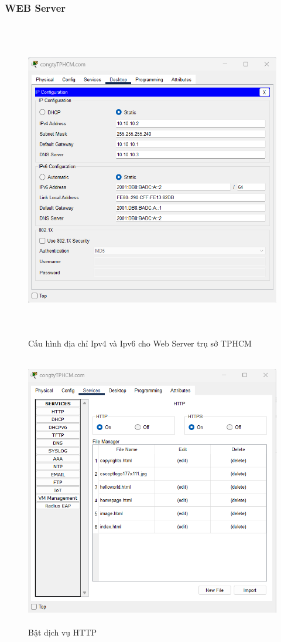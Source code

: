 \documentclass[12pt,a4paper]{report}
\begin{document}
\subsubsection{WEB Server }
\begin{figure}[H]
    \centering
    \includegraphics[width=16cm, height=14cm]{img/Web_Server1.png}
    \caption{Cấu hình địa chỉ Ipv4 và Ipv6 cho Web Server trụ sở TPHCM}
    \label{hinh421}
    
\end{figure}


\begin{figure}[H]
    \centering
    \includegraphics[width=17cm, height=12cm]{img/Web_Server2.png}
    \caption{ Bật dịch vụ HTTP}
    \label{hinh421b}
\end{figure}
\end{document}
